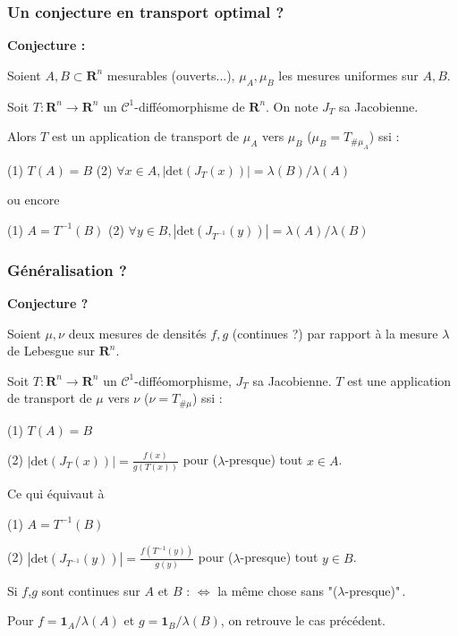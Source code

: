\documentclass{beamer}
\begin{document}
\begin{frame}
\end{frame}\begin{frame}\frametitle{Un conjecture en transport optimal ?}

    \textbf{Conjecture :}

    \bigskip

    Soient $A,B \subset \mathbf R^n $ mesurables (ouverts...), $ \mu_A, \mu_B$ les mesures uniformes sur $A,B$.

    Soit $ T : \mathbf R^n \to \mathbf R^n $ un $\mathcal C^1$-difféomorphisme de $\mathbf R^n$. On note $ J_T $ sa Jacobienne.

    \bigskip

    Alors $T$ est un application de transport de $ \mu_A $ vers $ \mu_B $ ($ \mu_B = T_{\# \mu_A} $) ssi :

    \bigskip

    (1) $T(A) = B$ \qquad     (2) $ \forall x \in A, |\mathrm{det} (J_T(x))| = \lambda(B) / \lambda(A)  $ 

    \bigskip

    ou encore 

    \bigskip

    (1) $A = T^{-1}(B)$ \qquad     (2) $ \forall y \in B,  |\mathrm{det} (J_{T^{-1}}(y))| =  \lambda(A) / \lambda(B)$


\end{frame}\begin{frame}\frametitle{Généralisation ?}

    \textbf{Conjecture ?}

    Soient $\mu, \nu $ deux mesures de densités $ f,g $ (continues ?) par rapport à la mesure $ \lambda $ de Lebesgue sur $ \mathbf R^n $.

    Soit $ T : \mathbf R^n \to \mathbf R^n $ un $\mathcal C^1$-difféomorphisme, $ J_T $ sa Jacobienne. $T$ est une application de transport de $ \mu $ vers $ \nu $ ($ \nu = T_{\# \mu } $) ssi :

    (1) $T(A) = B$ 

    (2) $ \displaystyle \left|\mathrm{det} (J_T(x))\right| = \frac{f(x)}{g(T(x))}  $ pour ($\lambda$-presque) tout $x \in A$.

    \bigskip

    Ce qui équivaut à

    (1) $A = T^{-1}(B)$ 

    (2) $ \displaystyle \left|\mathrm{det} (J_{T^{-1}}(y)) \right| = \frac{f(T^{-1}(y))}{g(y)} $ pour ($\lambda$-presque) tout $y \in B$.

    \bigskip

    Si $f$,$g$ sont continues sur $A$ et $B$ : $\iff$ la même chose sans "($\lambda$-presque)"\,.
    
    Pour $f = \mathbf 1_A / \lambda(A) $ et $ g = \mathbf 1_B / \lambda(B) $, on retrouve le cas précédent.


\end{frame}
\end{document}

